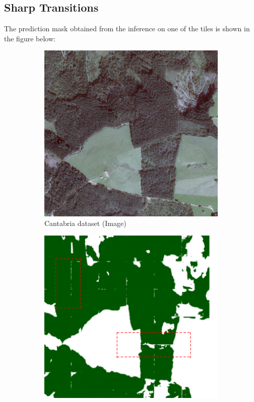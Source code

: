 \newpage


\subsection{Sharp Transitions}

The prediction mask obtained from the inference on one of the tiles is shown in the figure below: 

 \begin{figure}[H]
\centering
\begin{subfigure}{0.49\textwidth}
\centering
\includegraphics[width = \textwidth]{IMAGENES/IMG18-No-Aver-Img.PNG}
\caption{Cantabria dataset (Image)}
\label{fig:left}
\end{subfigure}
\begin{subfigure}{0.50\textwidth}
\centering
\includegraphics[width = \textwidth]{IMAGENES/IMG18-No-Aver-Mask2.PNG}

\end{subfigure}
\end{figure}
